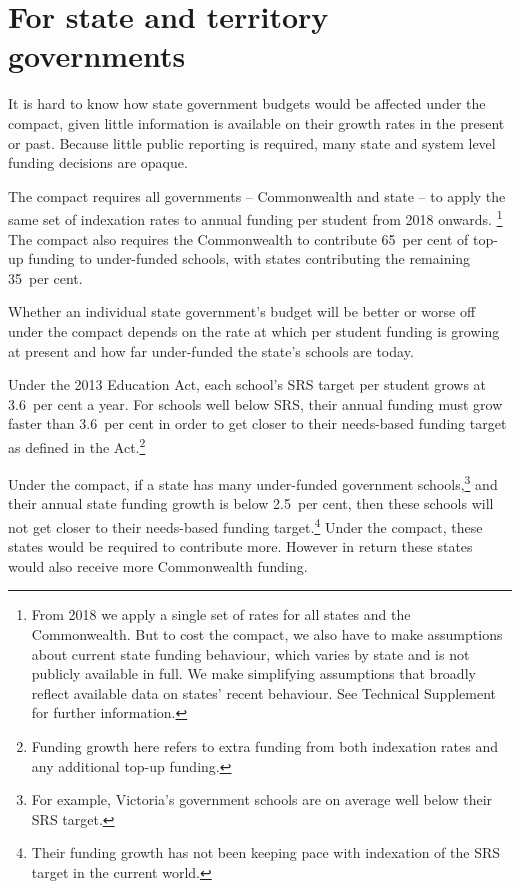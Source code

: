 \documentclass{grattan}
\begin{document}
\section{For state and territory governments}\label{sec:for-state-and-territory-governments}

It is hard to know how state government budgets would be affected under the compact, given little information is available on their growth rates in the present or past. Because little public reporting is required, many state and system level funding decisions are opaque.

The compact requires all governments -- Commonwealth and state -- to apply the same set of indexation rates to annual funding per student from 2018 onwards.%
\footnote{From 2018 we apply a single set of rates for all states and the Commonwealth.
But to cost the compact, we also have to make assumptions about current state funding behaviour, which varies by state and is not publicly available in full.
We make simplifying assumptions that broadly reflect available data on states' recent behaviour.
See Technical Supplement for further information.} The compact also requires the Commonwealth to contribute 65~per cent of top-up funding to under-funded schools, with states contributing the remaining 35~per cent.

Whether an individual state government's budget will be better or worse off under the compact depends on the rate at which per student funding is growing at present and how far under-funded the state's schools are today.

Under the 2013 Education Act, each school's SRS target per student grows at 3.6~per cent a year. For schools well below SRS, their annual funding must grow faster than 3.6~per cent in order to get closer to their needs-based funding target as defined in the Act.\footnote{Funding growth here refers to extra funding from both indexation rates and any additional top-up funding.}

Under the compact, if a state has many under-funded government schools,\footnote{For example, Victoria's government schools are on average well below their SRS target.} and their annual state funding growth is below 2.5~per cent, then these schools will not get closer to their needs-based funding target.\footnote{Their funding growth has not been keeping pace with indexation of the SRS target in the current world.} Under the compact, these states would be required to contribute more. However in return these states would also receive more Commonwealth funding.
\end{document}
